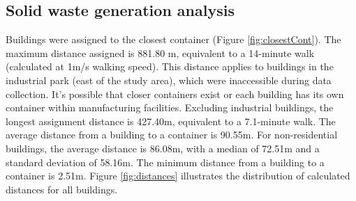 \documentclass[authoryear,preprint,review,11pt,doubleblind]{elsarticle}
\begin{document}




    \subsection{Solid waste generation analysis} \label{subsec:SolidWasteGen}
   Buildings were assigned to the closest container (Figure \ref{fig:closestCont}). The maximum distance assigned is 881.80 m, equivalent to a 14-minute walk (calculated at 1m/s walking speed). This distance applies to buildings in the industrial park (east of the study area), which were inaccessible during data collection. It's possible that closer containers exist or each building has its own container within manufacturing facilities. Excluding industrial buildings, the longest assignment distance is 427.40m, equivalent to a 7.1-minute walk. The average distance from a building to a container is 90.55m. For non-residential buildings, the average distance is 86.08m, with a median of 72.51m and a standard deviation of 58.16m. The minimum distance from a building to a container is 2.51m. Figure \ref{fig:distances} illustrates the distribution of calculated distances for all buildings.
\end{document}
